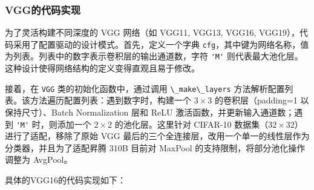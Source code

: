 \subsubsection{VGG的代码实现}\label{src-book-chapter3-h26}

为了灵活构建不同深度的 VGG 网络（如 VGG11, VGG13, VGG16,
VGG19），代码采用了配置驱动的设计模式。首先，定义一个字典
\passthrough{\lstinline!cfg!}，其中键为网络名称，值为列表。列表中的数字表示卷积层的输出通道数，字符
\passthrough{\lstinline!'M'!}
则代表最大池化层。这种设计使得网络结构的定义变得直观且易于修改。

接着，在 \passthrough{\lstinline!VGG!} 类的初始化函数中，通过调用
\passthrough{\lstinline!\_make\_layers!}
方法解析配置列表。该方法遍历配置列表：遇到数字时，构建一个
\(3 \times 3\) 的卷积层（padding=1 以保持尺寸）、Batch Normalization
层和 ReLU 激活函数，并更新输入通道数；遇到 \passthrough{\lstinline!'M'!}
时，则添加一个 \(2 \times 2\) 的池化层。这里针对 CIFAR-10
数据集（\(32 \times 32\)）进行了适配，移除了原始 VGG
最后的三个全连接层，改用一个单一的线性层作为分类器，并且为了适配昇腾
310B 目前对 MaxPool 的支持限制，将部分池化操作调整为 AvgPool。

具体的VGG16的代码实现如下：

